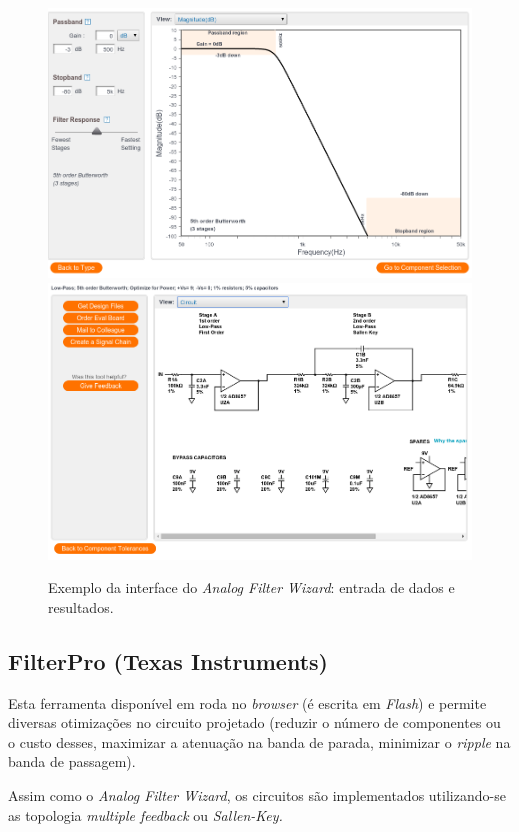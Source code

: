 \begin{figure}[H] 
\centering \includegraphics[scale=0.33]{images/screens/afd_in}
\centering \includegraphics[scale=0.33]{images/screens/afd_out}
\caption{Exemplo da interface do \textit{Analog Filter Wizard}: entrada de dados e resultados.} 
\label{fig:afw_example} 
\end{figure}

\subsection{FilterPro (Texas Instruments)}
Esta ferramenta disponível em \cite{ti_filter} roda no \textit{browser} (é escrita em \textit{Flash}) e permite diversas otimizações no circuito projetado (reduzir o número de componentes ou o custo desses, maximizar a atenuação na banda de parada, minimizar o \textit{ripple} na banda de passagem). 

Assim como o \textit{Analog Filter Wizard}, os circuitos são implementados utilizando-se as topologia \textit{multiple feedback} ou \textit{Sallen-Key.}

